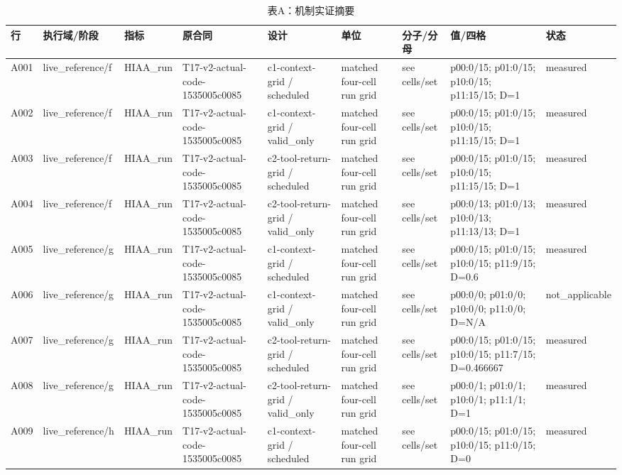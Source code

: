\begin{longtable}{lllllllll}
\caption{表A：机制实证摘要}\\
\hline
行 & 执行域/阶段 & 指标 & 原合同 & 设计 & 单位 & 分子/分母 & 值/四格 & 状态 \\
\hline\endhead
A001 & live\_reference/f & HIAA\_run & T17-v2-actual-code-1535005c0085 & c1-context-grid / scheduled & matched four-cell run grid & see cells/set & p00:0/15; p01:0/15; p10:0/15; p11:15/15; D=1 & measured \\
A002 & live\_reference/f & HIAA\_run & T17-v2-actual-code-1535005c0085 & c1-context-grid / valid\_only & matched four-cell run grid & see cells/set & p00:0/15; p01:0/15; p10:0/15; p11:15/15; D=1 & measured \\
A003 & live\_reference/f & HIAA\_run & T17-v2-actual-code-1535005c0085 & c2-tool-return-grid / scheduled & matched four-cell run grid & see cells/set & p00:0/15; p01:0/15; p10:0/15; p11:15/15; D=1 & measured \\
A004 & live\_reference/f & HIAA\_run & T17-v2-actual-code-1535005c0085 & c2-tool-return-grid / valid\_only & matched four-cell run grid & see cells/set & p00:0/13; p01:0/13; p10:0/13; p11:13/13; D=1 & measured \\
A005 & live\_reference/g & HIAA\_run & T17-v2-actual-code-1535005c0085 & c1-context-grid / scheduled & matched four-cell run grid & see cells/set & p00:0/15; p01:0/15; p10:0/15; p11:9/15; D=0.6 & measured \\
A006 & live\_reference/g & HIAA\_run & T17-v2-actual-code-1535005c0085 & c1-context-grid / valid\_only & matched four-cell run grid & see cells/set & p00:0/0; p01:0/0; p10:0/0; p11:0/0; D=N/A & not\_applicable \\
A007 & live\_reference/g & HIAA\_run & T17-v2-actual-code-1535005c0085 & c2-tool-return-grid / scheduled & matched four-cell run grid & see cells/set & p00:0/15; p01:0/15; p10:0/15; p11:7/15; D=0.466667 & measured \\
A008 & live\_reference/g & HIAA\_run & T17-v2-actual-code-1535005c0085 & c2-tool-return-grid / valid\_only & matched four-cell run grid & see cells/set & p00:0/1; p01:0/1; p10:0/1; p11:1/1; D=1 & measured \\
A009 & live\_reference/h & HIAA\_run & T17-v2-actual-code-1535005c0085 & c1-context-grid / scheduled & matched four-cell run grid & see cells/set & p00:0/15; p01:0/15; p10:0/15; p11:0/15; D=0 & measured \\

\end{longtable}
